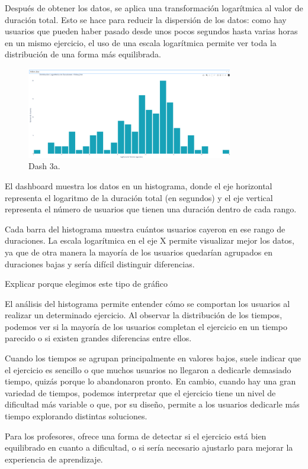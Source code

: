 \documentclass[a4paper, 12pt]{book}
\begin{document}
Después de obtener los datos, se aplica una transformación logarítmica al valor de duración total. Esto se hace para reducir la dispersión de los datos: como hay usuarios que pueden haber pasado desde unos pocos segundos hasta varias horas en un mismo ejercicio, el uso de una escala logarítmica permite ver toda la distribución de una forma más equilibrada.

\begin{figure}
  \centering
  \includegraphics[width=9cm, keepaspectratio]{img/3a.png}
  \caption{Dash 3a.}\label{fig:3a}
\end{figure}

El dashboard muestra los datos en un histograma, donde el eje horizontal representa el logaritmo de la duración total (en segundos) y el eje vertical representa el número de usuarios que tienen una duración dentro de cada rango.

Cada barra del histograma muestra cuántos usuarios cayeron en ese rango de duraciones. La escala logarítmica en el eje X permite visualizar mejor los datos, ya que de otra manera la mayoría de los usuarios quedarían agrupados en duraciones bajas y sería difícil distinguir diferencias.

Explicar porque elegimos este tipo de gráfico

El análisis del histograma permite entender cómo se comportan los usuarios al realizar un determinado ejercicio. Al observar la distribución de los tiempos, podemos ver si la mayoría de los usuarios completan el ejercicio en un tiempo parecido o si existen grandes diferencias entre ellos. 

Cuando los tiempos se agrupan principalmente en valores bajos, suele indicar que el ejercicio es sencillo o que muchos usuarios no llegaron a dedicarle demasiado tiempo, quizás porque lo abandonaron pronto. En cambio, cuando hay una gran variedad de tiempos, podemos interpretar que el ejercicio tiene un nivel de dificultad más variable o que, por su diseño, permite a los usuarios dedicarle más tiempo explorando distintas soluciones. 

Para los profesores, ofrece una forma de detectar si el ejercicio está bien equilibrado en cuanto a dificultad, o si sería necesario ajustarlo para mejorar la experiencia de aprendizaje.
\end{document}
